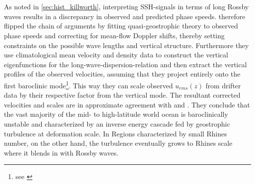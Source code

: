 \section*{\citealt{Tulloch2009}}\label{sec:hist-tulloch}
As noted in \ref{sec:hist_killworth}, interpreting SSH-signals in terms of long
Rossby waves results in a discrepancy in observed and predicted phase speeds.
\cite{Tulloch2009} therefore flipped the chain of arguments by fitting
quasi-geostrophic theory to observed phase speeds and correcting for mean-flow
Doppler shifts, thereby setting constraints on the possible wave lengths and
vertical structure. Furthermore they use climatological mean velocity and
density data to construct the vertical eigenfunctions for the
long-wave-dispersion-relation and then extract the vertical profiles of the
observed velocities, assuming that they project entirely onto the first
baroclinic mode\footnote{see \cite{wunsch1996ocean}}. This way they can scale
observed $u_{rms}(z)$ from drifter data by their respective factor from the
vertical mode. The resultant corrected velocities and scales are in approximate
agreement with \cite{Eden2006b} and \cite{Chelton2007}. They conclude that the
vast majority of the mid- to high-latitude
world ocean is baroclinically unstable and characterized by an inverse energy cascade fed by geostrophic turbulence at deformation scale. In Regions characterized by small Rhines number, on the other hand, the turbulence eventually grows to Rhines scale where it blends in with Rossby waves.




